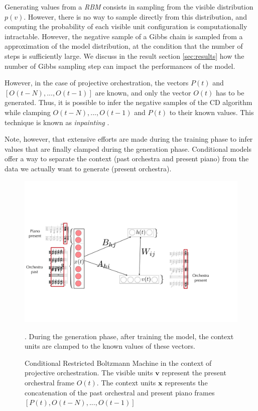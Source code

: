 \documentclass{article}
\begin{document}
Generating values from a \textit{RBM} consists in sampling from the visible distribution $p(v)$. However, there is no way to sample directly from this distribution, and computing the probability of each visible unit configuration is computationally intractable.
However, the negative sample of a Gibbs chain is sampled from a approximation of the model distribution, at the condition that the number of steps is sufficiently large. We discuss in the result section \ref{sec:results} how the number of Gibbs sampling step can impact the performances of the model.

However, in the case of projective orchestration, the vectors $P(t)$ and $[O(t-N), ..., O(t-1)]$ are known, and only the vector $O(t)$ has to be generated. 
Thus, it is possible to infer the negative samples of the CD algorithm while clamping $O(t-N), ..., O(t-1)$ and $P(t)$ to their known values. This technique is known as \textit{inpainting} \cite{Fischer2012}.

Note, however, that extensive efforts are made during the training phase to infer values that are finally clamped during the generation phase. Conditional models offer a way to separate the context (past orchestra and present piano) from the data we actually want to generate (present orchestra).

 \begin{figure}
 	\begin{centering}
 		\includegraphics[scale=0.2]{Models/lop_models}
 		\par\end{centering}
 	\caption{Conditional Restricted Boltzmann Machine in the context of projective orchestration. The visible units $\bm{v}$ represent the present orchestral frame $O(t)$. The context units $\bm{x}$ represents the concatenation of the past orchestral and present piano frames $[P(t), O(t-N), ..., O(t-1)]$}.
During the generation phase, after training the model, the context units are clamped to the known values of these vectors.
 	\label{fig:lop_models}
 \end{figure}
\end{document}
